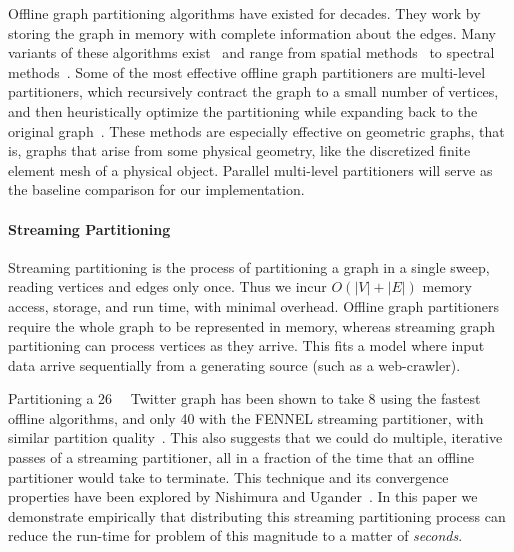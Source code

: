 Offline graph partitioning algorithms have existed for dec\-ades. They work by storing the graph in memory with complete information about the edges. Many variants of these algorithms exist~\cite{gpsurvey} and range from spatial methods~\cite{Gilbert95geometricmesh} to spectral methods~\cite{arora2009expander}. Some of the most effective offline graph partitioners are multi-level partitioners, which recursively contract the graph to a small number of vertices, and then heuristically optimize the partitioning while expanding back to the original graph~\cite{karypis1998multilevel}.
These methods are especially effective on geometric graphs, that is, graphs that arise from some physical geometry, like the discretized finite element mesh of a physical object.
Parallel multi-level partitioners will serve as the baseline comparison for our implementation. 

\paragraph{Streaming Partitioning}
Streaming partitioning is the process of partitioning a graph in a single sweep, reading vertices and edges only once. Thus we incur $O(|V| + |E|)$ memory access, storage, and run time, with minimal overhead. Offline graph partitioners require the whole graph to be represented in memory, whereas streaming graph partitioning can process vertices as they arrive. This fits a model where input data arrive sequentially from a generating source (such as a web-crawler).

Partitioning a \SI{26}{\giga\byte} Twitter graph has been shown to take \SI[abbreviations=false]{8}{\hours} using the fastest offline algorithms, and only \SI{40}{\minutes} with the FENNEL streaming partitioner, with similar partition quality~\cite{tsourakakis2012fennel}. This also suggests that we could do multiple, iterative passes of a streaming partitioner, all in a fraction of the time that an offline partitioner would take to terminate. This technique and its convergence properties have been explored by Nishimura and Ugander~\cite{nishimura2013restream}. In this paper we demonstrate empirically that distributing this streaming partitioning process can reduce the run-time for problem of this magnitude to a matter of \emph{seconds}. 

